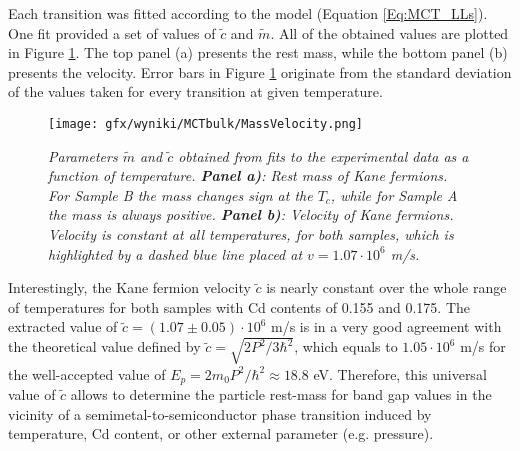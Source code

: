 \documentclass[titlepage,a4paper]{book}
\begin{document}
Each transition was fitted according to the model (Equation \ref{Eq:MCT_LLs}). One fit provided a set of values of $\tilde{c}$ and $\tilde{m}$. All of the obtained values are plotted in Figure \ref{fig:Bulk_MassVelocity}. The top panel (a) presents the rest mass, while the bottom panel (b) presents the velocity. Error bars in Figure \ref{fig:Bulk_MassVelocity} originate from the standard deviation of the values taken for every transition at given temperature.

\begin{figure}[ht]
	\centering
	\texttt{[image: gfx/wyniki/MCTbulk/MassVelocity.png]}
	\vspace{-10pt}
	\caption{\textit{Parameters $\tilde{m}$ and $\tilde{c}$ obtained from fits to the experimental data as a function of temperature. \textbf{Panel a)}: Rest mass of Kane fermions. For Sample B the mass changes sign at the $T_c$, while for Sample A the mass is always positive. \textbf{Panel b)}: Velocity of Kane fermions. Velocity is constant at all temperatures, for both samples, which is highlighted by a dashed blue line placed at $v = 1.07 \cdot 10^6$ m/s.}}
	\label{fig:Bulk_MassVelocity}
\end{figure}

Interestingly, the Kane fermion velocity $\tilde{c}$ is nearly constant over the whole range of temperatures for both samples with Cd contents of 0.155 and 0.175. The extracted value of $\tilde{c} = (1.07 \pm 0.05)\cdot 10^6$ m/s is in a very good agreement with the theoretical value defined by $\tilde{c} = \sqrt{2 P^2/3\hbar^2}$, which equals to $1.05 \cdot 10^6$ m/s for the well-accepted value of $E_p = 2m_0 P^2/ \hbar^2 \approx 18.8$ eV. Therefore, this universal value of $\tilde{c}$ allows to determine the particle rest-mass for band gap values in the vicinity of a semimetal-to-semiconductor phase transition induced by temperature, Cd content, or other external parameter (e.g. pressure).

\end{document}
